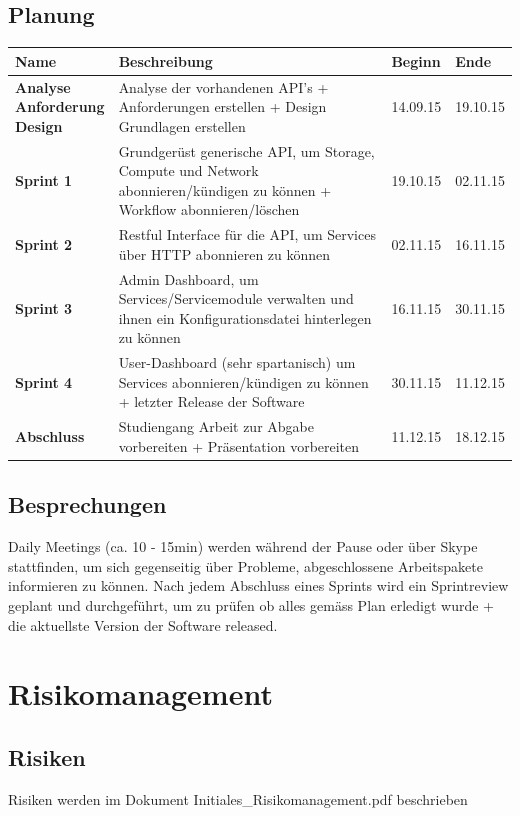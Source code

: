 \documentclass[11pt]{scrartcl}
\begin{document}
\subsection{Planung}
\begin{tabularx}{\textwidth}{l X l l}
\textbf{Name} & \textbf{Beschreibung} & \textbf{Beginn} &  \textbf{Ende} \\
\hline
\pbox{3cm}{
\textbf{Analyse}
\\
\textbf{Anforderung}
\\
\textbf{Design} 
}& Analyse der vorhandenen API's + Anforderungen 
erstellen + Design Grundlagen erstellen & 14.09.15 & 19.10.15\\
\hline
\textbf{Sprint 1} & Grundgerüst generische API, um Storage, Compute und Network 
abonnieren/kündigen zu können
+ Workflow abonnieren/löschen  & 19.10.15 & 02.11.15 \\
\hline
\textbf{Sprint 2} & Restful Interface für die API, um Services über HTTP 
abonnieren zu können
& 02.11.15 & 16.11.15 \\
\hline
\textbf{Sprint 3} & Admin Dashboard, um Services/Servicemodule verwalten 
und ihnen ein Konfigurationsdatei hinterlegen zu können & 16.11.15 & 30.11.15 \\
\hline
\textbf{Sprint 4} & User-Dashboard (sehr spartanisch)  um Services 
abonnieren/kündigen zu können
+ letzter Release der Software
& 30.11.15 & 11.12.15 \\
\hline
\textbf{Abschluss} & Studiengang Arbeit zur Abgabe vorbereiten + Präsentation 
vorbereiten & 11.12.15 & 18.12.15\\
\end{tabularx}

\subsection{Besprechungen}
Daily Meetings (ca. 10 - 15min) werden während der Pause oder über Skype stattfinden, um sich 
gegenseitig über Probleme, abgeschlossene Arbeitspakete informieren zu können.
Nach jedem Abschluss eines Sprints wird ein Sprintreview geplant und durchgeführt, um zu prüfen 
ob alles gemäss Plan erledigt wurde + die aktuellste Version der Software 
released.
\section{Risikomanagement}
\subsection{Risiken}
Risiken werden im Dokument Initiales\_Risikomanagement.pdf beschrieben
\end{document}

